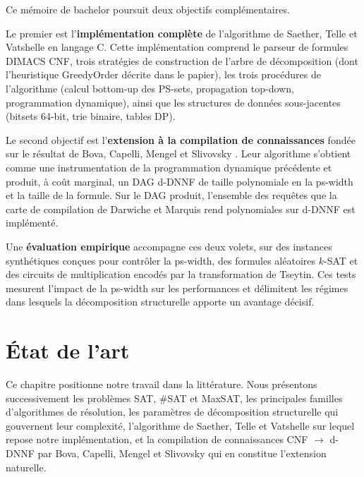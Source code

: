 \documentclass[11pt,a4paper]{report}
\theoremstyle{plain}
\theoremstyle{definition}
\begin{document}
Ce mémoire de bachelor poursuit deux objectifs complémentaires.

Le premier est l'\textbf{implémentation complète} de l'algorithme de Saether,
Telle et Vatshelle \cite{saether2015} en langage C. Cette implémentation comprend
le parseur de formules DIMACS CNF, trois stratégies de construction de l'arbre
de décomposition (dont l'heuristique GreedyOrder décrite dans le papier), les
trois procédures de l'algorithme (calcul bottom-up des PS-sets, propagation
top-down, programmation dynamique), ainsi que les structures de données
sous-jacentes (bitsets 64-bit, trie binaire, tables DP).

Le second objectif est l'\textbf{extension à la compilation de connaissances}
fondée sur le résultat de Bova, Capelli, Mengel et Slivovsky
\cite{bova2015}. Leur algorithme s'obtient comme une instrumentation de la
programmation dynamique précédente et produit, à coût marginal, un DAG
d-DNNF de taille polynomiale en la ps-width et la taille de la formule. Sur le DAG produit,
l'ensemble des requêtes que la carte de compilation de Darwiche et Marquis
\cite{darwiche2002} rend polynomiales sur d-DNNF est implémenté.

Une \textbf{évaluation empirique} accompagne ces deux volets, sur des
instances synthétiques conçues pour contrôler la ps-width, des formules
aléatoires $k$-SAT et des circuits de multiplication encodés par la
transformation de Tseytin. Ces tests mesurent l'impact de la ps-width sur
les performances et délimitent les régimes dans lesquels la décomposition
structurelle apporte un avantage décisif.

\chapter{État de l'art}
\label{chap:etat_art}

Ce chapitre positionne notre travail dans la littérature. Nous présentons
successivement les problèmes SAT, \#SAT et MaxSAT, les principales familles
d'algorithmes de résolution, les paramètres de décomposition structurelle
qui gouvernent leur complexité, l'algorithme de Saether, Telle et Vatshelle
sur lequel repose notre implémentation, et la compilation de connaissances
CNF $\to$ d-DNNF par Bova, Capelli, Mengel et Slivovsky qui en constitue
l'extension naturelle.
\end{document}

